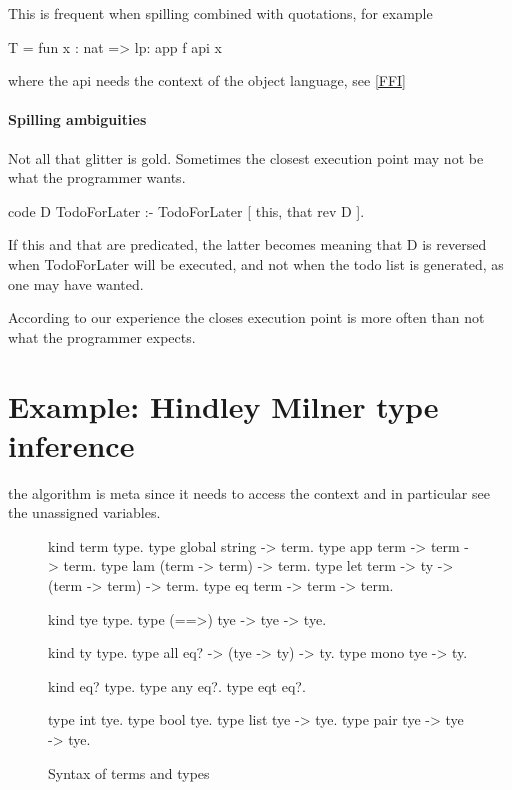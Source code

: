 \documentclass[a4paper, 11pt]{book}
\begin{document}
This is frequent when spilling combined with quotations, for example

\begin{elpicode}
  T = {{ fun x : nat => lp:{{ app f {api x}  }}  }}
\end{elpicode}

where the api needs the context of the object language, see \ref{FFI}

\paragraph{Spilling ambiguities}

Not all that glitter is gold. Sometimes the closest execution
point may not be what the programmer wants.

\begin{elpicode}
  code D TodoForLater  :-
    TodoForLater [ this, that {rev D} ].
\end{elpicode}

If this and that are predicated, the latter becomes
 meaning that
D is reversed when TodoForLater will be executed, and
not when the todo list is generated, as one may have wanted.

According to our experience the closes execution point
is more often than not what the programmer expects.

\section{Example: Hindley Milner type inference}

the algorithm is meta since it needs to access the context and
in particular see the unassigned variables.

\begin{figure}
\begin{elpicode}
kind term type.
type global  string -> term.
type app term -> term -> term.
type lam (term -> term) -> term.
type let term -> ty -> (term -> term) -> term.
type eq  term -> term -> term.

kind tye type.
type (==>) tye -> tye -> tye.  

kind ty type.
type all    eq? -> (tye -> ty) -> ty.
type mono   tye -> ty.

kind eq? type.
type any eq?. %
type eqt eq?. %

type int   tye.
type bool  tye.
type list  tye -> tye.
type pair  tye -> tye -> tye.
\end{elpicode}
\caption[syntax]{Syntax of terms and types\label{hm:syntax}}
\end{figure}
\end{document}
